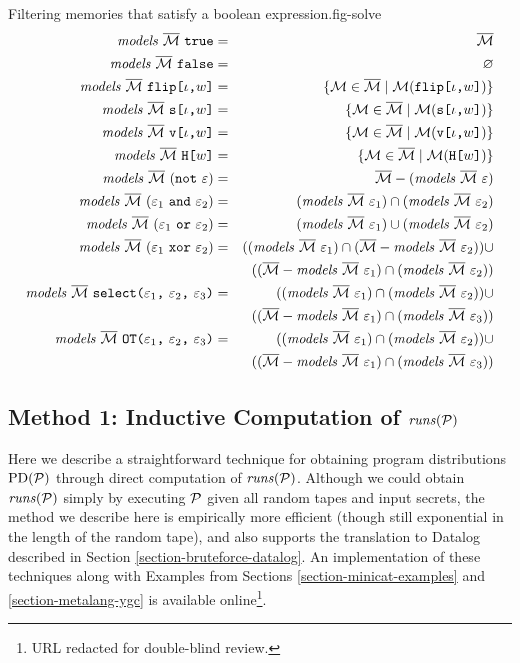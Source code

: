 \begin{fpfig}[t]{Filtering memories that satisfy a boolean expression.}{fig-solve}
\begin{eqnarray*}
\solve{\stores}{\etrue} &=& \stores\\
\solve{\stores}{\efalse} &=& \varnothing\\
\solve{\stores}{\flip{\cid}{w}} &=& \{ \store \in \stores \mid \store(\flip{\cid}{w}) \} \\
\solve{\stores}{\secret{\cid}{w}} &=& \{ \store \in \stores \mid \store(\secret{\cid}{w}) \} \\
\solve{\stores}{\view{\cid}{w}} &=& \{ \store \in \stores \mid \store(\view{\cid}{w}) \} \\
\solve{\stores}{\oracle{w}} &=& \{ \store \in \stores \mid \store(\oracle{w}) \} \\
\solve{\stores}{(\enot\ \be)} &=& \stores - (\solve{\stores}{\be})\\
\solve{\stores}{(\be_1\ \eand\ \be_2)} &=& (\solve{\stores}{\be_1}) \cap (\solve{\stores}{\be_2}) \\
\solve{\stores}{(\be_1\ \eor\ \be_2)} &=& (\solve{\stores}{\be_1}) \cup (\solve{\stores}{\be_2}) \\
\solve{\stores}{(\be_1\ \exor\ \be_2)} &=&
 ((\solve{\stores}{\be_1}) \cap (\stores - \solve{\stores}{\be_2})) \cup\\
 && ((\stores - \solve{\stores}{\be_1}) \cap (\solve{\stores}{\be_2})) \\
\solve{\stores}{\select{\be_1}{\be_2}{\be_3}} &=&
 ((\solve{\stores}{\be_1}) \cap (\solve{\stores}{\be_2})) \cup \\
 && ((\stores - \solve{\stores}{\be_1}) \cap (\solve{\stores}{\be_3})) \\
\solve{\stores}{\OT{\be_1}{\be_2}{\be_3}} &=&
 ((\solve{\stores}{\be_1}) \cap (\solve{\stores}{\be_2})) \cup\\
 && ((\stores - \solve{\stores}{\be_1}) \cap (\solve{\stores}{\be_3}))
\end{eqnarray*}
\end{fpfig}

\subsection{Method 1: Inductive Computation of $\runs(\prog)$}
\label{section-bruteforce-tables}

Here we describe a straightforward technique for obtaining program
distributions $\progd(\prog)$ through direct computation of
$\runs(\prog)$. Although we could obtain $\runs(\prog)$ simply by
executing $\prog$ given all random tapes and input secrets, the method
we describe here is empirically more efficient (though still
exponential in the length of the random tape), and also supports the
translation to Datalog described in Section
\ref{section-bruteforce-datalog}. An implementation of these
techniques along with Examples from Sections
\ref{section-minicat-examples} and \ref{section-metalang-ygc} is
available online\footnote{URL redacted for double-blind review.}.

